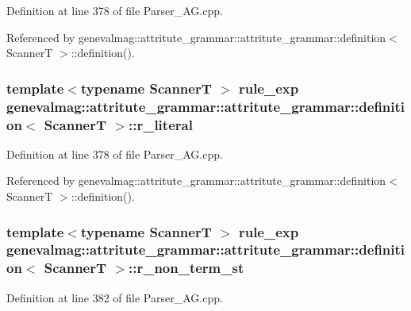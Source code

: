 Definition at line 378 of file Parser\_\-AG.cpp.

Referenced by genevalmag::attritute\_\-grammar::attritute\_\-grammar::definition$<$ ScannerT $>$::definition().\hypertarget{structgenevalmag_1_1attritute__grammar_1_1definition_b371b4ff8112c77303fa0e17739ced35}{
\subsubsection[{r\_\-literal}]{\setlength{\rightskip}{0pt plus 5cm}template$<$typename ScannerT $>$ {\bf rule\_\-exp} genevalmag::attritute\_\-grammar::attritute\_\-grammar::definition$<$ ScannerT $>$::{\bf r\_\-literal}}}
\label{structgenevalmag_1_1attritute__grammar_1_1definition_b371b4ff8112c77303fa0e17739ced35}




Definition at line 378 of file Parser\_\-AG.cpp.

Referenced by genevalmag::attritute\_\-grammar::attritute\_\-grammar::definition$<$ ScannerT $>$::definition().\hypertarget{structgenevalmag_1_1attritute__grammar_1_1definition_d615a11fc0fef3ae0d28dd3e07838da6}{
\subsubsection[{r\_\-non\_\-term\_\-st}]{\setlength{\rightskip}{0pt plus 5cm}template$<$typename ScannerT $>$ {\bf rule\_\-exp} genevalmag::attritute\_\-grammar::attritute\_\-grammar::definition$<$ ScannerT $>$::{\bf r\_\-non\_\-term\_\-st}}}
\label{structgenevalmag_1_1attritute__grammar_1_1definition_d615a11fc0fef3ae0d28dd3e07838da6}




Definition at line 382 of file Parser\_\-AG.cpp.

